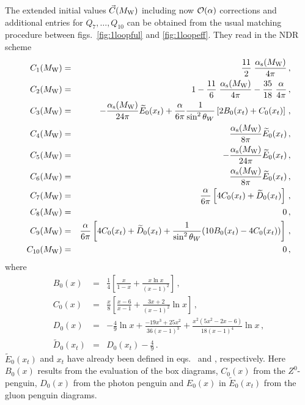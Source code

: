 The extended initial values $\vec{C}(M_{\rm W})$ including now ${\cal O}(\alpha)$
corrections and additional entries for $Q_7,\ldots,Q_{10}$ can be
obtained from the usual matching procedure between figs.\ \ref{fig:1loopful}
and \ref{fig:1loopeff}. They read in the NDR scheme \cite{burasetal:92d}
\begin{eqnarray}
C_1(M_{\rm W}) &=&     \frac{11}{2} \; \frac{\alpha_{\rm s}(M_{\rm W})}{4\pi} \, ,
\label{eq:CMw1} \\
C_2(M_{\rm W}) &=& 1 - \frac{11}{6} \; \frac{\alpha_{\rm s}(M_{\rm W})}{4\pi}
               - \frac{35}{18} \; \frac{\alpha}{4\pi} \, ,
\label{eq:CMw2} \\
C_3(M_{\rm W}) &=& -\frac{\alpha_{\rm s}(M_{\rm W})}{24\pi} \widetilde{E}_0(x_t)
             +\frac{\alpha}{6\pi} \frac{1}{\sin^2\theta_W}
             \left[ 2 B_0(x_t) + C_0(x_t) \right] \, , 
\label{eq:CMw3} \\
C_4(M_{\rm W}) &=& \frac{\alpha_{\rm s}(M_{\rm W})}{8\pi} \widetilde{E}_0(x_t) \, ,
\label{eq:CMw4} \\
C_5(M_{\rm W}) &=& -\frac{\alpha_{\rm s}(M_{\rm W})}{24\pi} \widetilde{E}_0(x_t) \, ,
\label{eq:CMw5} \\
C_6(M_{\rm W}) &=& \frac{\alpha_{\rm s}(M_{\rm W})}{8\pi} \widetilde{E}_0(x_t) \, ,
\label{eq:CMw6} \\
C_7(M_{\rm W}) &=& \frac{\alpha}{6\pi} \left[ 4 C_0(x_t) + \widetilde{D}_0(x_t)
\right]\, ,
\label{eq:CMw7} \\
C_8(M_{\rm W}) &=& 0 \, ,
\label{eq:CMw8} \\
C_9(M_{\rm W}) &=& \frac{\alpha}{6\pi} \left[ 4 C_0(x_t) + \widetilde{D}_0(x_t) +
             \frac{1}{\sin^2\theta_W} (10 B_0(x_t) - 4 C_0(x_t)) \right] \, ,
\label{eq:CMw9} \\
C_{10}(M_{\rm W}) &=& 0 \, ,
\label{eq:CMw10}
\end{eqnarray}
where
\begin{eqnarray}
B_0(x) &=& \frac{1}{4} \left[ \frac{x}{1-x} + \frac{x \ln x}{(x-1)^2}
\right]\, , \label{eq:Bxt} \\
C_0(x) &=& \frac{x}{8} \left[ \frac{x-6}{x-1} + \frac{3 x + 2}{(x-1)^2}
\ln x \right]\, ,
\label{eq:Cxt} \\
D_0(x) &=& -\frac{4}{9} \ln x + \frac{-19 x^3 + 25 x^2}{36 (x-1)^3} +
         \frac{x^2 (5 x^2 - 2 x - 6)}{18 (x-1)^4} \ln x \, ,
\label{eq:Dxt} \\
\widetilde{D}_0(x_t) &=& D_0(x_t) - \frac{4}{9} \, .
\label{eq:Dxttilde} 
\end{eqnarray}
$\widetilde{E}_0(x_t)$ and $x_t$ have already been defined in
eqs.\  and , respectively.  Here $B_0(x)$
results from the evaluation of the box diagrams, $C_0(x)$ from the
$Z^0$-penguin, $D_0(x)$ from the photon penguin and $E_0(x)$ in
$\widetilde{E}_0(x_t)$ from the gluon penguin diagrams.

